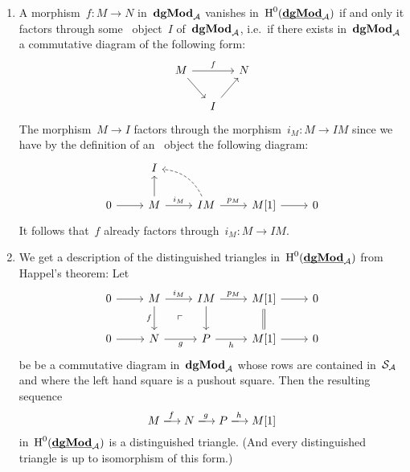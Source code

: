 \documentclass[a4paper,10pt]{scrartcl}
\begin{document}
\begin{enumerate}
  \item
    A morphism~$f \colon M \to N$ in~$\mathbf{dgMod}_{\mathcal{A}}$ vanishes in~$\operatorname{H}^0(\underline{\smash{\mathbf{dgMod}}}_{\mathcal{A}})$ if and only it factors through some~{\injective{$\Sfrob_{\Acat}$}} object~$I$ of~$\mathbf{dgMod}_{\mathcal{A}}$, i.e.\ if there exists in~$\mathbf{dgMod}_{\mathcal{A}}$ a commutative diagram of the following form:
    \[
      \begin{tikzcd}[column sep = small]
        M
        \arrow{rr}[above]{f}
        \arrow{dr}
        &
        {}
        &
        N
        \\
        {}
        &
        I
        \arrow{ur}
        &
        {}
      \end{tikzcd}
    \]
    The morphism~$M \to I$ factors through the morphism~$i_M \colon M \to IM$ since we have by the definition of an~{\injective{$\Sfrob_{\Acat}$}} object the following diagram:
    \[
      \begin{tikzcd}
        {}
        &
        I
        &
        {}
        &
        {}
        &
        {}
        \\
        0
        \arrow{r}
        &
        M
        \arrow{u}
        \arrow{r}[above]{i_M}
        &
        IM
        \arrow[dashed, bend right]{ul}
        \arrow{r}[above]{p_M}
        &
        M[1]
        \arrow{r}
        &
        0
      \end{tikzcd}
    \]
    It follows that~$f$ already factors through~$i_M \colon M \to IM$.
  \item
    We get a description of the distinguished triangles in~$\operatorname{H}^0(\underline{\smash{\mathbf{dgMod}}}_{\mathcal{A}})$ from Happel’s theorem:
    Let
    \[
      \begin{tikzcd}
        0
        \arrow{r}
        &
        M
        \arrow{r}[above]{i_M}
        \arrow{d}[left]{f}
        \arrow[phantom]{dr}{\ulcorner}
        &
        IM
        \arrow{r}[above]{p_M}
        \arrow{d}
        &
        M[1]
        \arrow{r}
        \arrow[equal]{d}
        &
        0
        \\
        0
        \arrow{r}
        &
        N
        \arrow{r}[below]{g}
        &
        P
        \arrow{r}[below]{h}
        &
        M[1]
        \arrow{r}
        &
        0
      \end{tikzcd}
    \]
    be be a commutative diagram in~$\mathbf{dgMod}_{\mathcal{A}}$ whose rows are contained in~$\Sfrob_{\Acat}$ and where the left hand square is a pushout square.
    Then the resulting sequence
    \[
      M
      \xlongto{f}
      N
      \xlongto{g}
      P
      \xlongto{h}
      M[1]
    \]
    in~$\operatorname{H}^0(\underline{\smash{\mathbf{dgMod}}}_{\mathcal{A}})$ is a distinguished triangle.
    (And every distinguished triangle is up to isomorphism of this form.)
\end{enumerate}
\end{document}

